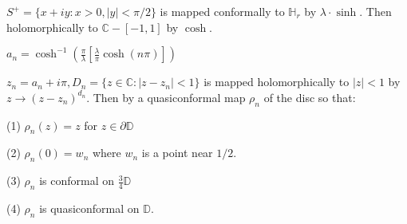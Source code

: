 \documentclass{beamer}
\begin{document}
\begin{frame} 

$S^+ = \{ x + iy : x > 0, |y| < \pi/2 \}$ is mapped conformally to $\mathbb{H}_r$ by $\lambda\cdot\sinh$. Then holomorphically to $\mathbb{C} - [-1,1]$ by $\cosh$.

\vspace{2.5mm}

$a_n = \cosh^{-1}\left( \frac{\pi}{\lambda} \left[ \frac{\lambda}{\pi} \cosh(n\pi) \right] \right)$

\vspace{2.5mm}

$z_n = a_n + i\pi, D_n = \{ z \in \mathbb{C} : \left| z - z_n \right| < 1\} $ is mapped holomorphically to $|z|<1$ by $z\rightarrow (z - z_n)^{d_n}$. Then by a quasiconformal map $\rho_n$ of the disc so that: 

\hspace{5mm} (1) $\rho_n(z)=z$ for $z\in\partial\mathbb{D}$

\hspace{5mm} (2) $\rho_n(0)=w_n$ where $w_n$ is a point near $1/2$.

\hspace{5mm} (3) $\rho_n$ is conformal on $\frac{3}{4}\mathbb{D}$

\hspace{5mm} (4) $\rho_n$ is quasiconformal on $\mathbb{D}$. 

\end{frame}
\end{document}
